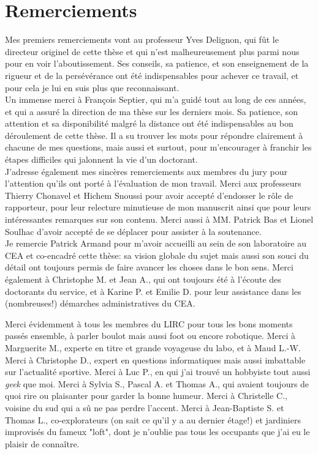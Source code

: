 \clearpage
\pagestyle{empty}


\section*{Remerciements}
{\small 
Mes premiers remerciements vont au professeur Yves Delignon, qui fût le directeur originel de cette thèse et qui n'est malheureusement plus parmi nous pour en voir l'aboutissement. Ses conseils, sa patience, et son enseignement de la rigueur et de la persévérance ont été indispensables pour achever ce travail, et pour cela je lui en suis plus que reconnaissant. \\

Un immense merci à François Septier, qui m'a guidé tout au long de ces années, et qui a assuré la direction de ma thèse sur les derniers mois. Sa patience, son attention et sa disponibilité malgré la distance ont été indispensables au bon déroulement de cette thèse. Il a su trouver les mots pour répondre clairement à chacune de mes questions, mais aussi et surtout, pour m'encourager à franchir les étapes difficiles qui jalonnent la vie d'un doctorant. \\

J'adresse également mes sincères remerciements aux membres du jury pour l'attention qu'ils ont porté à l'évaluation de mon travail. Merci aux professeurs Thierry Chonavel et Hichem Snoussi pour avoir accepté d'endosser le rôle de rapporteur, pour leur relecture minutieuse de mon manuscrit ainsi que pour leurs intéressantes remarques sur son contenu. Merci aussi à MM. Patrick Bas et Lionel Soulhac d'avoir accepté de se déplacer pour assister à la soutenance. \\

Je remercie Patrick Armand pour m'avoir accueilli au sein de son laboratoire au CEA et co-encadré cette thèse: sa vision globale du sujet mais aussi son souci du détail ont toujours permis de faire avancer les choses dans le bon sens. Merci également à Christophe M.  et Jean A., qui ont toujours été à l'écoute des doctorants du service, et à Karine P. et Emilie D. pour leur assistance dans les (nombreuses!) démarches administratives du CEA.

 Merci évidemment à tous les membres du LIRC pour tous les bons moments passés ensemble, à parler boulot mais aussi foot ou encore robotique. Merci à Marguerite M., experte en titre et grande voyageuse du labo, et à Maud L.-W. Merci à Christophe D., expert en questions informatiques mais aussi imbattable sur l'actualité sportive. Merci à Luc P., en qui j'ai trouvé un hobbyiste tout aussi \textit{geek} que moi. Merci à Sylvia S., Pascal A. et Thomas A., qui avaient toujours de quoi rire ou plaisanter pour garder la bonne humeur. Merci à Christelle C., voisine du sud qui a sû ne pas perdre l'accent. Merci à Jean-Baptiste S. et Thomas L., co-explorateurs (on sait ce qu'il y a au dernier étage!) et jardiniers improvisés du fameux "loft", dont je n'oublie pas tous les occupants que j'ai eu le plaisir de connaître.
 

}
